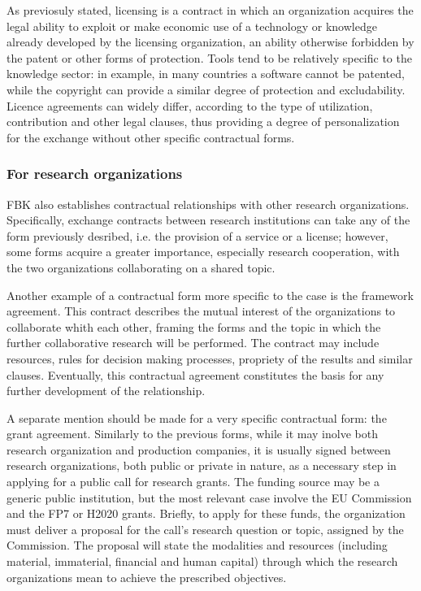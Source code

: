 As previosuly stated, licensing is a contract in which an organization acquires the legal ability to exploit or make economic use of a technology or knowledge already developed by the licensing organization, an ability otherwise forbidden by the patent or other forms of protection. Tools tend to be relatively specific to the knowledge sector: in example, in many countries a software cannot be patented, while the copyright can provide a similar degree of protection and excludability. Licence agreements can widely differ, according to the type of utilization, contribution and other legal clauses, thus providing a degree of personalization for the exchange without other specific contractual forms.

\subsubsection{For research organizations}

FBK also establishes contractual relationships with other research organizations. Specifically, exchange contracts between research institutions can take any of the form previously desribed, i.e. the provision of a service or a license; however, some forms acquire a greater importance, especially research cooperation, with the two organizations collaborating on a shared topic.

Another example of a contractual form more specific to the case is the framework agreement. This contract describes the mutual interest of the organizations to collaborate whith each other, framing the forms and the topic in which the further collaborative research will be performed. The contract may include resources, rules for decision making processes, propriety of the results and similar clauses. Eventually, this contractual agreement constitutes the basis for any further development of the relationship.

A separate mention should be made for a very specific contractual form: the grant agreement. Similarly to the previous forms, while it may inolve both research organization and production companies, it is usually signed between research organizations, both public or private in nature, as a necessary step in applying for a public call for research grants. The funding source may be a generic public institution, but the most relevant case involve the EU Commission and the FP7 or H2020 grants. Briefly, to apply for these funds, the organization must deliver a proposal for the call's research question or topic, assigned by the Commission. The proposal will state the modalities and resources (including material, immaterial, financial and human capital) through which the research organizations mean to achieve the prescribed objectives.

